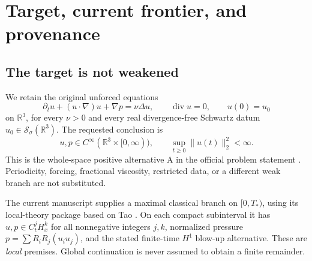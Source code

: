 \documentclass[11pt,a4paper]{article}
\theoremstyle{definition}
\theoremstyle{remark}
\newcommand{\R}{\mathbb R}
\newcommand{\norm}[1]{\lVert #1\rVert}
\newcommand{\diver}{\operatorname{div}}
\newcommand{\Sch}{\mathcal S_\sigma(\R^3)}
\numberwithin{equation}{section}
\begin{document}
\section{Target, current frontier, and provenance}\label{sec:frontier}
\subsection{The target is not weakened}
We retain the original unforced equations
\begin{equation}\label{eq:NS}
\partial_tu+(u\cdot\nabla)u+\nabla p=\nu\Delta u,
\qquad \diver u=0,
\qquad u(0)=u_0
\end{equation}
on \(\R^3\), for every \(\nu>0\) and every real divergence-free Schwartz datum \(u_0\in\Sch\). The requested conclusion is
\begin{equation}\label{eq:target}
u,p\in C^\infty(\R^3\times[0,\infty)),
\qquad \sup_{t\ge0}\norm{u(t)}_2^2<\infty.
\end{equation}
This is the whole-space positive alternative A in the official problem statement \cite{Clay}. Periodicity, forcing, fractional viscosity, restricted data, or a different weak branch are not substituted.

The current manuscript \cite{Paper} supplies a maximal classical branch on \([0,T_*)\), using its local-theory package based on Tao \cite{Tao}. On each compact subinterval it has \(u,p\in C^j_tH^k_x\) for all nonnegative integers \(j,k\), normalized pressure \(p=\sum R_iR_j(u_iu_j)\), and the stated finite-time \(H^1\) blow-up alternative. These are \emph{local} premises. Global continuation is never assumed to obtain a finite remainder.
\end{document}
